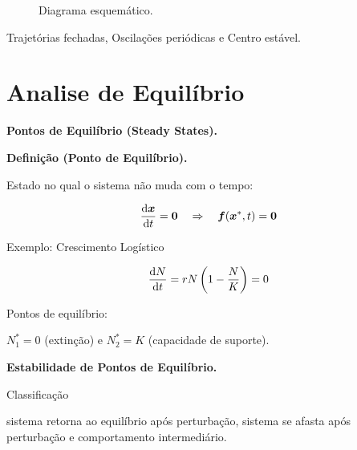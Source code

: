 %
\begin{figure}[htbp]
\centering
{}
\caption{Diagrama esquemático.}
\end{figure}
%

Trajetórias fechadas, Oscilações periódicas e Centro estável.

\section{Analise de Equilíbrio}

\textbf{Pontos de Equilíbrio (Steady States).}

\textbf{Definição (Ponto de Equilíbrio).}

Estado no qual o sistema não muda com o tempo:

%
\begin{equation*}
\frac{\mathrm{d} \boldsymbol{x}}{\mathrm{d} t} = \boldsymbol{0} \quad \Rightarrow \quad \boldsymbol{f}(\boldsymbol{x}^*, t) = \boldsymbol{0}
\end{equation*}
%

Exemplo: Crescimento Logístico

%
\begin{equation*}
\frac{\mathrm{d} N}{\mathrm{d} t} = rN\left(1 - \frac{N}{K}\right) = 0
\end{equation*}
%

Pontos de equilíbrio:

$N^*_1 = 0$ (extinção) e $N^*_2 = K$ (capacidade de suporte).

\textbf{Estabilidade de Pontos de Equilíbrio.}

Classificação

sistema retorna ao equilíbrio após perturbação, sistema se afasta após perturbação e comportamento intermediário.

